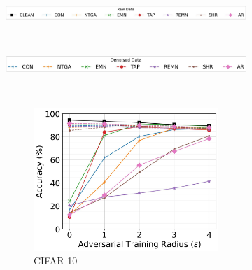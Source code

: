 \documentclass[conference]{IEEEtran}
\theoremstyle{definition}
\theoremstyle{remark}
\theoremstyle{proposition}
\begin{document}
\begin{figure}[p!]
	\centering
    \begin{subfigure}{0.8\textwidth}
	\centering
	\includegraphics[width=1.0\textwidth]{figures/AT_Legend_RAW.jpg}
    \end{subfigure}\\\vspace*{0.2em}
    \begin{subfigure}{0.7\textwidth}
	\centering
	\includegraphics[width=1.0\textwidth]{figures/AT_Legend_SAN.jpg}
    \end{subfigure}\\
    \begin{subfigure}{1.0\textwidth}
	\begin{subfigure}{.3\textwidth}
		\centering
		\includegraphics[width=1.0\textwidth]{RN-18_AT_CIFAR-10.jpg}
		\caption*{CIFAR-10}
		\label{fig:at_cifar10:rn18}
	\end{subfigure}\hspace*{0.75em}
	\begin{subfigure}{.3\textwidth}
		\centering

\end{subfigure}
\end{subfigure}
\end{figure}
\end{document}
